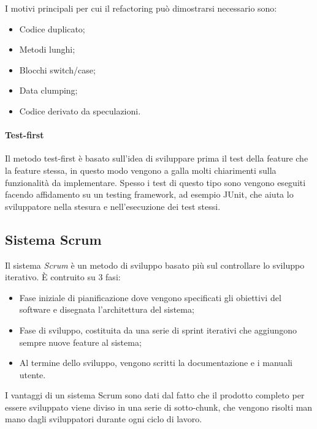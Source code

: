 \documentclass[a4paper, 10pt]{article}
\begin{document}
		I motivi principali per cui il refactoring può dimostrarsi necessario sono:
		\begin{itemize}
			\item Codice duplicato;
			\item Metodi lunghi;
			\item Blocchi switch/case;
			\item Data clumping;
			\item Codice derivato da speculazioni.
		\end{itemize}
		
		\paragraph{Test-first} Il metodo test-first è basato sull'idea di sviluppare prima il test della feature che la feature stessa, in questo modo vengono a galla molti chiarimenti sulla funzionalità da implementare. Spesso i test di questo tipo sono vengono eseguiti facendo affidamento su un testing framework, ad esempio JUnit, che aiuta lo sviluppatore nella stesura e nell'esecuzione dei test stessi.
		
	\subsection{Sistema Scrum}
		Il sistema \textit{Scrum} è un metodo di sviluppo basato più sul controllare lo sviluppo iterativo. È contruito su 3 fasi:
		\begin{itemize}
			\item Fase iniziale di pianificazione dove vengono specificati gli obiettivi del software e disegnata l'architettura del sistema;
			\item Fase di sviluppo, costituita da una serie di sprint iterativi che aggiungono sempre nuove feature al sistema;
			
			\item Al termine dello sviluppo, vengono scritti la documentazione e i manuali utente.
		\end{itemize}
		I vantaggi di un sistema Scrum sono dati dal fatto che il prodotto completo per essere sviluppato viene diviso in una serie di sotto-chunk, che vengono risolti man mano dagli sviluppatori durante ogni ciclo di lavoro.
		
\end{document}
